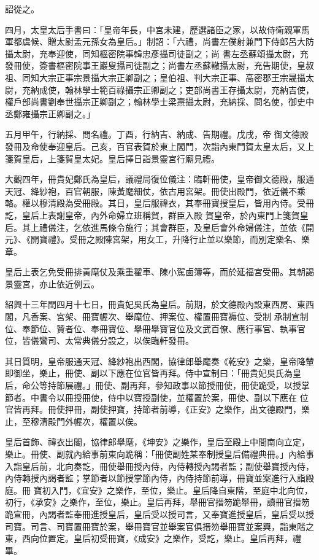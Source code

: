 \begin{pinyinscope}
 詔從之。



 四月，太皇太后手書曰：「皇帝年長，中宮未建，歷選諸臣之家，以故侍衛親軍馬軍都虞候、贈太尉孟元孫女為皇后。」制詔：「六禮，尚書左僕射兼門下侍郎呂大防攝太尉，充奉迎使，同知樞密院事韓忠彥攝司徒副之；尚
 書左丞蘇頌攝太尉，充發冊使，簽書樞密院事王巖叟攝司徒副之；尚書左丞蘇轍攝太尉，充告期使，皇叔祖、同知大宗正事宗景攝大宗正卿副之；皇伯祖、判大宗正事、高密郡王宗晟攝太尉，充納成使，翰林學士範百祿攝宗正卿副之；吏部尚書王存攝太尉，充納吉使，權戶部尚書劉奉世攝宗正卿副之；翰林學士梁燾攝太尉，充納採、問名使，御史中丞鄭雍攝宗正卿副之。」



 五月甲午，行納採、問名禮。丁酉，行納吉、納成、告期禮。戊戌，帝
 御文德殿發冊及命使奉迎皇后。己亥，百官表賀於東上閣門，次詣內東門賀太皇太后，又上箋賀皇后，上箋賀皇太妃。皇后擇日詣景靈宮行廟見禮。



 大觀四年，冊貴妃鄭氏為皇后，議禮局復位儀注：臨軒冊使，皇帝御文德殿，服通天冠、絳紗袍，百官朝服，陳黃麾細仗，依古用宮架。冊使出殿門，依近儀不乘輅。權以穆清殿為受冊殿。其日，皇后服禕衣，其奉冊寶授皇后，皆用內侍。受冊訖，皇后上表謝皇帝，內外命婦立班稱賀，群臣入殿
 賀皇帝，於內東門上箋賀皇后。其上禮儀注，乞依進馬條令施行；其會群臣，及皇后會外命婦儀注，並依《開元》、《開寶禮》。受冊之殿陳宮架，用女工，升降行止並以樂節，而別定樂名、樂章。



 皇后上表乞免受冊排黃麾仗及乘重翟車、陳小駕鹵簿等，而於延福宮受冊。其朝謁景靈宮，亦止依近例云。



 紹興十三年閏四月十七日，冊貴妃吳氏為皇后。前期，於文德殿內設東西房、東西閣，凡香案、宮架、冊寶幄次、舉麾位、押案位、權置冊寶褥位、受制
 承制宣制位、奉節位、贊者位、奉冊寶位、舉冊舉寶官位及文武百僚、應行事官、執事官位，皆儀鸞司、太常典儀分設之，以俟臨軒發冊。



 其日質明，皇帝服通天冠、絳紗袍出西閣，協律郎舉麾奏《乾安》之樂，皇帝降輦即御坐，樂止，冊使、副以下應在位官皆再拜。侍中宣制曰：「冊貴妃吳氏為皇后，命公等持節展禮。」冊使、副再拜，參知政事以節授冊使，冊使跪受，以授掌節者。中書令以冊授冊使，侍中以寶授副使，並權置於案，冊使、副以下應在
 位官皆再拜。冊使押冊，副使押寶，持節者前導，《正安》之樂作，出文德殿門，樂止，至穆清殿門外幄次，權置以俟。



 皇后首飾、禕衣出閣，協律郎舉麾，《坤安》之樂作，皇后至殿上中間南向立定，樂止。冊使、副就內給事前東向跪稱：「冊使副姓某奉制授皇后備禮典冊。」內給事入詣皇后前，北向奏訖，冊使舉冊授內侍，內侍轉授內謁者監；副使舉寶授內侍，內侍轉授內謁者監；掌節者以節授掌節內侍，內侍持節前導，冊寶並案進行入詣殿庭。冊
 寶初入門，《宜安》之樂作，至位，樂止。皇后降自東階，至庭中北向位，初行，《承安》之樂作，至位，樂止。皇后再拜，舉冊官搢笏跪舉冊，讀冊官搢笏跪宣冊，內謁者監奉冊進授皇后，皇后受以授司言，又奉寶進授皇后，皇后受以授司寶。司言、司寶置冊寶於案，舉冊寶官並舉案官俱搢笏舉冊寶並案興，詣東階之東，西向位置定。皇后初受冊寶，《成安》之樂作，受訖，樂止。皇后再拜，禮畢。




\end{pinyinscope}
